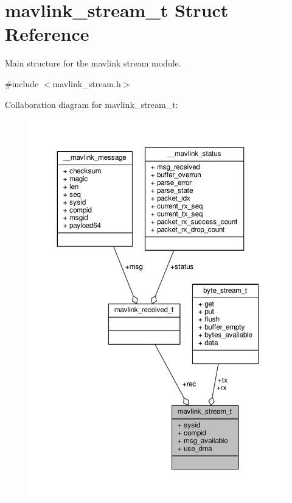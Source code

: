 \hypertarget{structmavlink__stream__t}{\section{mavlink\+\_\+stream\+\_\+t Struct Reference}
\label{structmavlink__stream__t}
}


Main structure for the mavlink stream module.  




{\ttfamily \#include $<$mavlink\+\_\+stream.\+h$>$}



Collaboration diagram for mavlink\+\_\+stream\+\_\+t\+:
\nopagebreak
\begin{figure}[H]
\begin{center}
\leavevmode
\includegraphics[width=350pt]{structmavlink__stream__t__coll__graph}
\end{center}
\end{figure}

